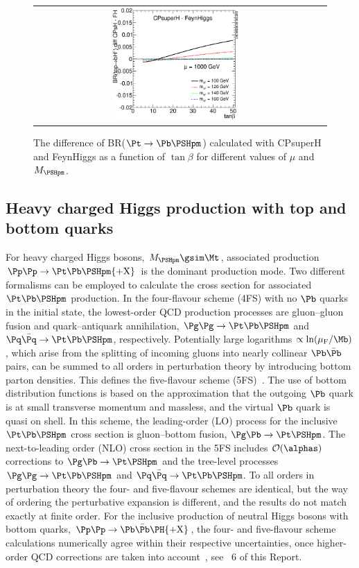 \begin{figure}[ht]
\begin{tabular}{cc}
   \includegraphics[width=0.46\textwidth]{YRHXS_MSSM_charged/YRHXS_MSSM_charged_fig2d.eps} \\
  \end{tabular}
\caption{The difference of BR($\Pt\rightarrow \Pb\PSHpm$) calculated
  with {\sc CPsuperH} and {\sc FeynHiggs} as a function of $\tan\beta$
  for different values of $\mu$ and $\MHpm$.}
\label{fig:BRTop2HPlusDiff}
\end{figure}

\subsection{Heavy charged Higgs production with top and bottom quarks}
\label{subsec:CH_tbh}

For heavy charged Higgs bosons,  $\MHpm \gsim \Mt$,
associated production $\Pp\Pp \to {\Pt}\Pb \PSHpm{\rm + X}$ is the
dominant production mode. 
Two different formalisms can be employed to calculate the cross
section for associated ${\Pt}\Pb\PSHpm$ production.  In the
four-flavour scheme (4FS) with no $\Pb$ quarks in the initial state,
the lowest-order QCD production processes are gluon--gluon fusion and
quark--antiquark annihilation, $\Pg\Pg \to {\Pt}\Pb\PSHpm$ and
$\Pq\bar \Pq \to {\Pt}\Pb\PSHpm$, respectively. Potentially
large logarithms $\propto \ln(\mu_{\rm F}/\Mb)$, which arise from
the splitting of incoming gluons into nearly collinear $\Pb\bar \Pb$
pairs, can be summed to all orders in perturbation theory by
introducing bottom parton densities. This defines the five-flavour
scheme (5FS)~\cite{Barnett:1987jw}. The use of bottom distribution
functions is based on the approximation that the outgoing $\Pb$ quark
is at small transverse momentum and massless, and the virtual $\Pb$
quark is quasi on shell. In this scheme, the leading-order (LO)
process for the inclusive $\Pt\Pb\PSHpm$ cross section is
gluon--bottom fusion, $\Pg \Pb \to \Pt \PSHpm$.  The next-to-leading
order (NLO) cross section in the 5FS includes ${\cal
  O}(\alphas)$ corrections to $\Pg \Pb \to \Pt  \PSHpm$
and the tree-level processes $\Pg\Pg \to \Pt\Pb\PSHpm$ and $\Pq\bar
\Pq \to \Pt\Pb\PSHpm$. To all orders in perturbation theory the four-
and five-flavour schemes are identical, but the way of ordering the
perturbative expansion is different, and the results do not match
exactly at finite order. For the inclusive production of neutral Higgs 
bosons with bottom quarks, $\Pp\Pp \to \Pb\bar{\Pb}\PH{\rm + X}$, the
four- and five-flavour scheme calculations numerically agree within
their respective uncertainties, once higher-order QCD corrections are
taken into account~\cite{Dittmaier:2003ej, Campbell:2004pu,
  Dawson:2005vi, Buttar:2006zd}, see \Section~6 of this Report.
  
